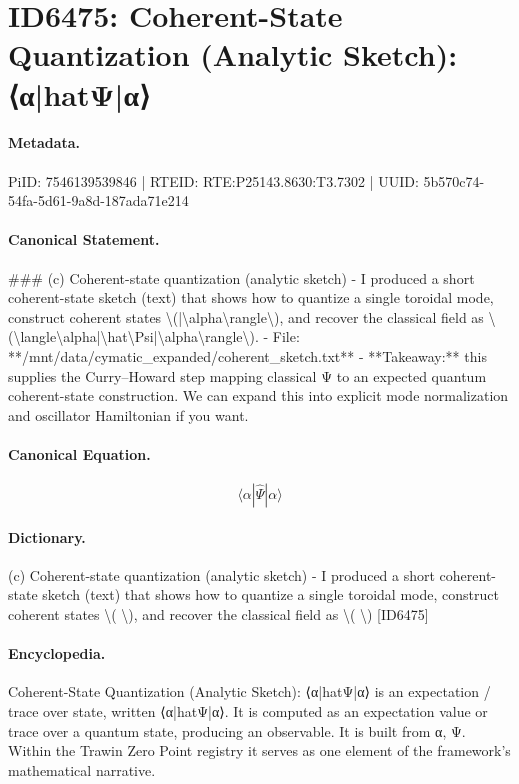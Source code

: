 \section*{ID6475: Coherent-State Quantization (Analytic Sketch): ⟨α|hatΨ|α⟩}
\paragraph{Metadata.}
PiID: 7546139539846 | RTEID: RTE:P25143.8630:T3.7302 | UUID: 5b570c74-54fa-5d61-9a8d-187ada71e214

\paragraph{Canonical Statement.}
\#\#\# (c) Coherent-state quantization (analytic sketch) - I produced a short coherent-state sketch (text) that shows how to quantize a single toroidal mode, construct coherent states \textbackslash{}(|\textbackslash{}alpha\textbackslash{}rangle\textbackslash{}), and recover the classical field as \textbackslash{}(\textbackslash{}langle\textbackslash{}alpha|\textbackslash{}hat\textbackslash{}Psi|\textbackslash{}alpha\textbackslash{}rangle\textbackslash{}). - File: **/mnt/data/cymatic\_expanded/coherent\_sketch.txt** - **Takeaway:** this supplies the Curry–Howard step mapping classical Ψ to an expected quantum coherent-state construction. We can expand this into explicit mode normalization and oscillator Hamiltonian if you want.

\paragraph{Canonical Equation.}
\[
\langle\alpha|\hat\Psi|\alpha\rangle
\]

\paragraph{Dictionary.}
(c) Coherent-state quantization (analytic sketch) - I produced a short coherent-state sketch (text) that shows how to quantize a single toroidal mode, construct coherent states \textbackslash{}( \textbackslash{}), and recover the classical field as \textbackslash{}( \textbackslash{}) [ID6475]

\paragraph{Encyclopedia.}
Coherent-State Quantization (Analytic Sketch): ⟨α|hatΨ|α⟩ is an expectation / trace over state, written ⟨α|hatΨ|α⟩. It is computed as an expectation value or trace over a quantum state, producing an observable. It is built from α, Ψ. Within the Trawin Zero Point registry it serves as one element of the framework's mathematical narrative.
